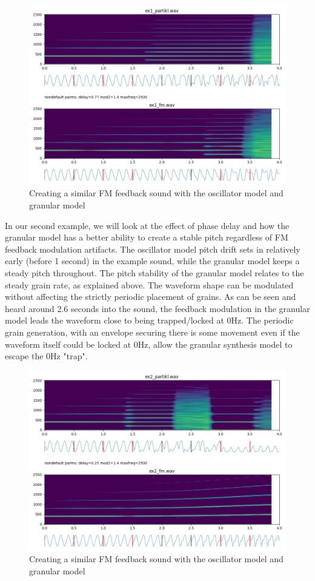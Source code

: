 \documentclass[runningheads,a4paper]{llncs}
\begin{document}
\begin{figure}
	\centering
	\includegraphics[width=.95\textwidth]{ex1_compare.png}
	\caption{Creating a similar FM feedback sound with the oscillator model and granular model}
	\label{fig:ex1}
\end{figure}

In our second example, we will look at the effect of phase delay and how the granular model has a better ability to create a stable pitch regardless of FM feedback modulation artifacts. The oscillator model pitch drift sets in relatively early (before 1 second) in the example sound, while the granular model keeps a steady pitch throughout. The pitch stability of the granular model relates to the steady grain rate, as explained above. The waveform shape can be modulated without affecting the strictly periodic placement of grains. As can be seen and heard around 2.6 seconds into the sound, the feedback modulation in the granular model leads the waveform close to being trapped/locked at 0Hz. The periodic grain generation, with an envelope securing there is some movement even if the waveform itself could be locked at 0Hz, allow the granular synthesis model to escape the 0Hz "trap".

\begin{figure}
	\centering
	\includegraphics[width=.95\textwidth]{ex2_compare.png}
	\caption{Creating a similar FM feedback sound with the oscillator model and granular model}
	\label{fig:ex2}
\end{figure}
\end{document}
